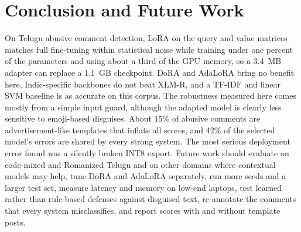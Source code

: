 \documentclass{svproc}
\begin{document}
\section{Conclusion and Future Work}
\label{sec:concl}
On Telugu abusive comment detection, LoRA on the query and value matrices matches full fine-tuning within statistical noise while training under one percent of the parameters and using about a third of the GPU memory, so a 3.4~MB adapter can replace a 1.1~GB checkpoint. DoRA and AdaLoRA bring no benefit here, Indic-specific backbones do not beat XLM-R, and a TF-IDF and linear SVM baseline is as accurate on this corpus. The robustness measured here comes mostly from a simple input guard, although the adapted model is clearly less sensitive to emoji-based disguises. About 15\% of abusive comments are advertisement-like templates that inflate all scores, and 42\% of the selected model's errors are shared by every strong system. The most serious deployment error found was a silently broken INT8 export. Future work should evaluate on code-mixed and Romanized Telugu and on other domains where contextual models may help, tune DoRA and AdaLoRA separately, run more seeds and a larger test set, measure latency and memory on low-end laptops, test learned rather than rule-based defenses against disguised text, re-annotate the comments that every system misclassifies, and report scores with and without template posts.
\end{document}
